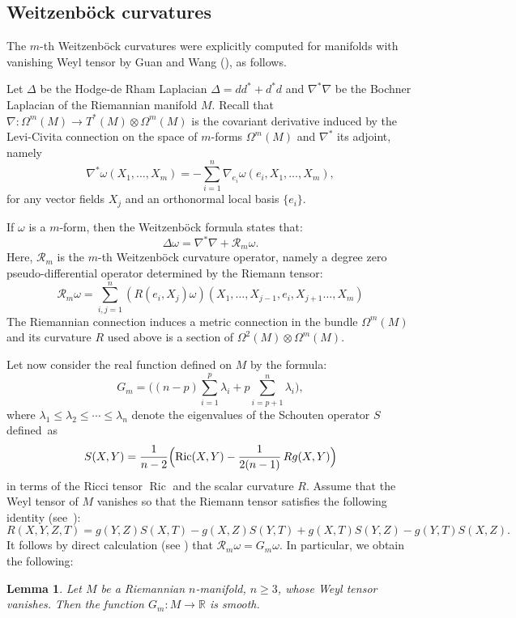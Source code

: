 \documentclass[10pt]{amsart}
\let\mathcal\mathscr
\DeclareMathOperator{\Ric}{Ric}
\newtheorem{lemma}[theorem]{Lemma}
\theoremstyle{definition}
\theoremstyle{remark}
\numberwithin{equation}{section}
\newcommand{\RR}{\mathbb R}
\begin{document}
\subsection{Weitzenböck curvatures}
The $m$-th Weitzenböck curvatures were explicitly computed
for manifolds with vanishing Weyl tensor by Guan and Wang (\cite{GW}), as follows.

Let $\Delta$ be the Hodge-de Rham Laplacian
$\Delta=dd^*+d^*d$ and $\nabla^*\nabla$ be the Bochner Laplacian of the Riemannian manifold $M$.
Recall that $\nabla:\Omega^m(M)\to T^*(M)\otimes \Omega^m(M)$ is the covariant derivative
induced by the Levi-Civita connection on the space of $m$\nobreakdash-forms $\Omega^m(M)$ and $\nabla^*$ its adjoint, namely
\[ \nabla^*\omega(X_1,\ldots,X_m)=-\sum_{i=1}^n\nabla_{e_i}\omega(e_i,X_1,\ldots,X_m) ,\]
for any vector fields $X_j$ and an orthonormal local basis $\{e_i\}$.

If $\omega$ is a $m$-form, then the Weitzenböck formula states that:
\[ \Delta \omega = \nabla^*\nabla + \mathcal R_m \omega.\]
Here, $\mathcal R_m$ is the $m$-th Weitzenböck curvature operator, namely a degree zero pseudo-differential operator
determined by the Riemann tensor:
\[ \mathcal R_m\omega= \sum_{i,j=1}^n (R(e_i,X_j)\omega)(X_1,\ldots, X_{j-1},e_i,X_{j+1}\ldots,X_m)\]
The Riemannian connection induces a metric connection in the bundle $\Omega^m(M)$ and its curvature
$R$ used above is a section of $\Omega^2(M)\otimes \Omega^m(M)$.

Let now consider the real function defined on $M$ by the formula:
\[ G_m=\biggl((n-p)\sum_{i=1}^p\lambda_i +p\sum_{i=p+1}^n\lambda_i\biggr),\]
where $\lambda_1\!\leq\!\lambda_2\!\leq \cdots \leq\!\lambda_n$ denote
the eigenvalues of the Schouten operator $S$ defined~as
\[ S(X,Y)= \frac{1}{n-2}\Bigl(\Ric(X,Y)-\frac{1}{2(n-1)}\,R g(X,Y)\Bigr)\]
in terms of the Ricci tensor $\Ric$ and the scalar curvature $R$.
Assume that the Weyl tensor of $M$ vanishes so that
the Riemann tensor satisfies the following identity (see~\cite{La}):
\[ R(X,Y,Z,T)=g(Y,Z)S(X,T)-g(X,Z)S(Y,T)+g(X,T)S(Y,Z)-g(Y,T)S(X,Z).\]
It follows by direct calculation (see \cite[App.]{GW}) that $\mathcal R_m \omega = G_m \omega$.
In particular, we obtain the following:
\begin{lemma}\label{weitz}
Let $M$ be a Riemannian $n$-manifold, $n\geq3$, whose Weyl tensor vanishes.
Then the function $G_m:M\to \RR$ is smooth.
\end{lemma}
\end{document}
